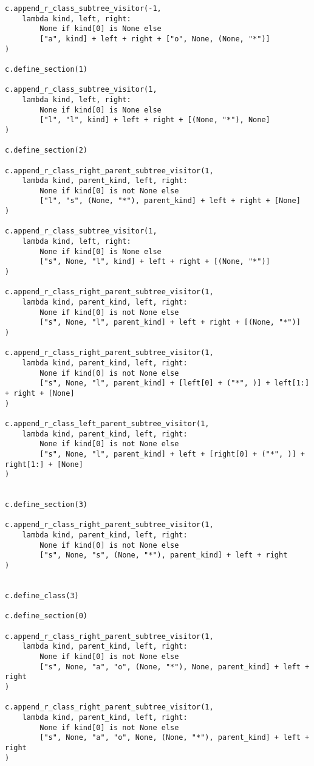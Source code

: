 \documentclass[final]{article}
\theoremstyle{definition}
\theoremstyle{remark}
\begin{document}
\begin{lstlisting}
c.append_r_class_subtree_visitor(-1,
    lambda kind, left, right:
        None if kind[0] is None else
        ["a", kind] + left + right + ["o", None, (None, "*")]
)

c.define_section(1)

c.append_r_class_subtree_visitor(1,
    lambda kind, left, right:
        None if kind[0] is None else
        ["l", "l", kind] + left + right + [(None, "*"), None]
)

c.define_section(2)

c.append_r_class_right_parent_subtree_visitor(1,
    lambda kind, parent_kind, left, right:
        None if kind[0] is not None else
        ["l", "s", (None, "*"), parent_kind] + left + right + [None]
)

c.append_r_class_subtree_visitor(1,
    lambda kind, left, right:
        None if kind[0] is None else
        ["s", None, "l", kind] + left + right + [(None, "*")]
)

c.append_r_class_right_parent_subtree_visitor(1,
    lambda kind, parent_kind, left, right:
        None if kind[0] is not None else
        ["s", None, "l", parent_kind] + left + right + [(None, "*")]
)

c.append_r_class_right_parent_subtree_visitor(1,
    lambda kind, parent_kind, left, right:
        None if kind[0] is not None else
        ["s", None, "l", parent_kind] + [left[0] + ("*", )] + left[1:] + right + [None]
)

c.append_r_class_left_parent_subtree_visitor(1,
    lambda kind, parent_kind, left, right:
        None if kind[0] is not None else
        ["s", None, "l", parent_kind] + left + [right[0] + ("*", )] + right[1:] + [None]
)


c.define_section(3)

c.append_r_class_right_parent_subtree_visitor(1,
    lambda kind, parent_kind, left, right:
        None if kind[0] is not None else
        ["s", None, "s", (None, "*"), parent_kind] + left + right
)


c.define_class(3)

c.define_section(0)

c.append_r_class_right_parent_subtree_visitor(1,
    lambda kind, parent_kind, left, right:
        None if kind[0] is not None else
        ["s", None, "a", "o", (None, "*"), None, parent_kind] + left + right
)

c.append_r_class_right_parent_subtree_visitor(1,
    lambda kind, parent_kind, left, right:
        None if kind[0] is not None else
        ["s", None, "a", "o", None, (None, "*"), parent_kind] + left + right
)


\end{lstlisting}
\end{document}

